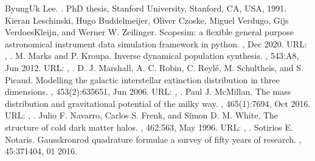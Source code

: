 \documentclass[letterpaper,10pt,english]{sphinxmanual}
\begin{document}
\begin{sphinxthebibliography}{10}
\sphinxAtStartPar
Byung\sphinxhyphen{}Uk Lee. . PhD thesis, Stanford University, Stanford, CA, USA, 1991.
\sphinxAtStartPar
Kieran Leschinski, Hugo Buddelmeijer, Oliver Czoske, Miguel Verdugo, Gijs Verdoes\sphinxhyphen{}Kleijn, and Werner W. Zeilinger. Scopesim: a flexible general purpose astronomical instrument data simulation framework in python. , Dec 2020. URL: , .
\sphinxAtStartPar
M. Marks and P. Kroupa. Inverse dynamical population synthesis. , 543:A8, Jun 2012. URL: , .
\sphinxAtStartPar
D. J. Marshall, A. C. Robin, C. Reylé, M. Schultheis, and S. Picaud. Modelling the galactic interstellar extinction distribution in three dimensions. , 453(2):635\textendash{}651, Jun 2006. URL: , .
\sphinxAtStartPar
Paul J. McMillan. The mass distribution and gravitational potential of the milky way. , 465(1):76\textendash{}94, Oct 2016. URL: , .
\sphinxAtStartPar
Julio F. Navarro, Carlos S. Frenk, and Simon D. M. White. The structure of cold dark matter halos. , 462:563, May 1996. URL: , .
\sphinxAtStartPar
Sotirios E. Notaris. Gauss\sphinxhyphen{}kronrod quadrature formulae \sphinxhyphen{} a survey of fifty years of research. , 45:371\textendash{}404, 01 2016.
\sphinxAtStartPar

\end{sphinxthebibliography}
\end{document}
